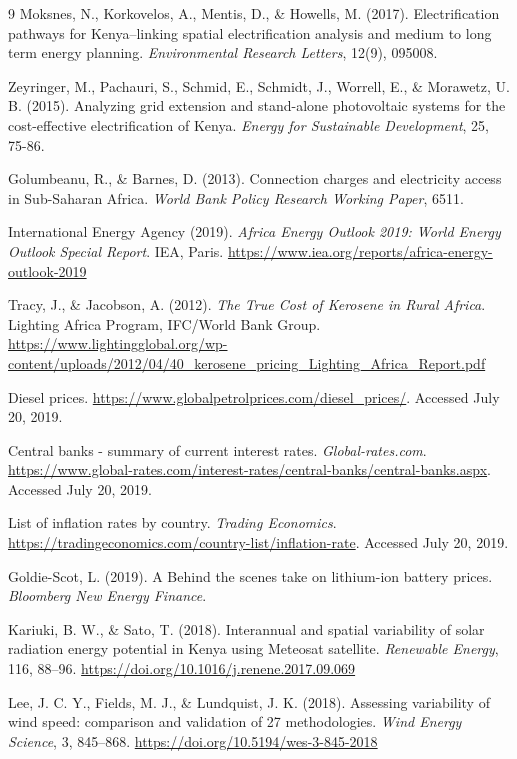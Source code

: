 \documentclass[final,3p,times]{elsarticle}
\begin{document}
\begin{thebibliography}{9}
Moksnes, N., Korkovelos, A., Mentis, D., \& Howells, M. (2017). Electrification pathways for Kenya–linking spatial electrification analysis and medium to long term energy planning. \textit{Environmental Research Letters}, 12(9), 095008.

Zeyringer, M., Pachauri, S., Schmid, E., Schmidt, J., Worrell, E., \& Morawetz, U. B. (2015). Analyzing grid extension and stand-alone photovoltaic systems for the cost-effective electrification of Kenya. \textit{Energy for Sustainable Development}, 25, 75-86.

Golumbeanu, R., \& Barnes, D. (2013). Connection charges and electricity access
in Sub-Saharan Africa. \textit{World Bank Policy Research Working Paper}, 6511.

International Energy Agency (2019). \textit{Africa Energy Outlook 2019: World
Energy Outlook Special Report}. IEA, Paris.
\url{https://www.iea.org/reports/africa-energy-outlook-2019}

Tracy, J., \& Jacobson, A. (2012). \textit{The True Cost of Kerosene in Rural
Africa}. Lighting Africa Program, IFC/World Bank Group.
\url{https://www.lightingglobal.org/wp-content/uploads/2012/04/40_kerosene_pricing_Lighting_Africa_Report.pdf}

Diesel prices. \url{https://www.globalpetrolprices.com/diesel_prices/}. Accessed July 20, 2019.

Central banks - summary of current interest rates. \textit{Global-rates.com}. \url{https://www.global-rates.com/interest-rates/central-banks/central-banks.aspx}. Accessed July 20, 2019.

List of inflation rates by country. \textit{Trading Economics}.
\url{https://tradingeconomics.com/country-list/inflation-rate}. Accessed July 20, 2019.

Goldie-Scot, L. (2019). A Behind the scenes take on lithium-ion battery prices. \textit{Bloomberg New Energy Finance}.

Kariuki, B. W., \& Sato, T. (2018). Interannual and spatial variability of solar radiation energy potential in Kenya using Meteosat satellite. \textit{Renewable Energy}, 116, 88--96. \url{https://doi.org/10.1016/j.renene.2017.09.069}

Lee, J. C. Y., Fields, M. J., \& Lundquist, J. K. (2018). Assessing variability of wind speed: comparison and validation of 27 methodologies. \textit{Wind Energy Science}, 3, 845--868. \url{https://doi.org/10.5194/wes-3-845-2018}


\end{thebibliography}
\end{document}

